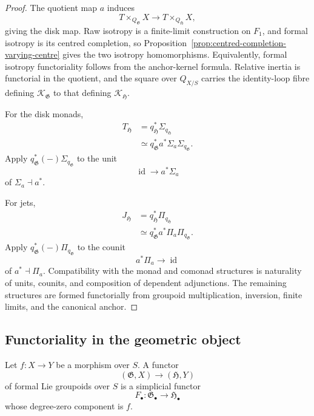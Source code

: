 \begin{proof}
The quotient map $a$ induces
\[
    T\times_{Q_{\mathfrak G}}X
    \longrightarrow
    T\times_{Q_{\mathfrak H}}X,
\]
giving the disk map.  Raw isotropy is a finite-limit construction on
$F_1$, and formal isotropy is its centred completion, so
Proposition~\ref{prop:centred-completion-varying-centre} gives the two
isotropy homomorphisms.  Equivalently, formal isotropy functoriality follows
from the anchor-kernel formula.  Relative inertia is functorial in the
quotient, and the square over $Q_{X/S}$ carries the identity-loop fibre
defining $\mathcal K_{\mathfrak G}$ to that defining
$\mathcal K_{\mathfrak H}$.

For the disk monads,
\[
\begin{aligned}
    T_{\mathfrak H}
    &=
    q_{\mathfrak H}^*\Sigma_{q_{\mathfrak H}}\\
    &\simeq
    q_{\mathfrak G}^*a^*\Sigma_a\Sigma_{q_{\mathfrak G}}.
\end{aligned}
\]
Apply
$q_{\mathfrak G}^*(-)\Sigma_{q_{\mathfrak G}}$
to the unit
\[
    \operatorname{id}\longrightarrow a^*\Sigma_a
\]
of $\Sigma_a\dashv a^*$.

For jets,
\[
\begin{aligned}
    J_{\mathfrak H}
    &=
    q_{\mathfrak H}^*\Pi_{q_{\mathfrak H}}\\
    &\simeq
    q_{\mathfrak G}^*a^*\Pi_a\Pi_{q_{\mathfrak G}}.
\end{aligned}
\]
Apply
$q_{\mathfrak G}^*(-)\Pi_{q_{\mathfrak G}}$
to the counit
\[
    a^*\Pi_a\longrightarrow\operatorname{id}
\]
of $a^*\dashv\Pi_a$.  Compatibility with the monad and comonad structures
is naturality of units, counits, and composition of dependent adjunctions.
The remaining structures are formed functorially from groupoid
multiplication, inversion, finite limits, and the canonical anchor.
\end{proof}

\subsection{Functoriality in the geometric object}

\begin{definition}
\label{def:functor-formal-lie-groupoids}
Let $f:X\to Y$ be a morphism over $S$.  A functor
\[
    (\mathfrak G,X)\longrightarrow(\mathfrak H,Y)
\]
of formal Lie groupoids over $S$ is a simplicial functor
\[
    F_\bullet:
    \mathfrak G_\bullet\longrightarrow\mathfrak H_\bullet
\]
whose degree-zero component is $f$.
\end{definition}

